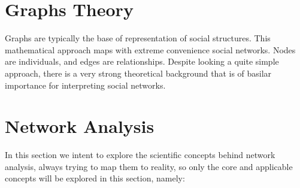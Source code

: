 \section{Graphs Theory}
Graphs are typically the base of representation of social structures. This mathematical approach maps with  extreme convenience social networks. Nodes are individuals, and edges are relationships. Despite looking a quite simple approach, there is a very strong theoretical background that is of basilar importance for interpreting social networks.


\section{Network Analysis}
In this section we intent to explore the scientific concepts behind network analysis, always trying to map them to reality, so only the core
and applicable concepts will be explored in this section, namely:

